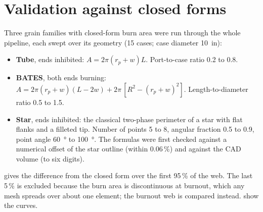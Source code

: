 \documentclass[10pt,a4paper]{article}
\begin{document}
\section{Validation against closed forms}
\label{sec:closed}

Three grain families with closed-form burn area were run through the whole pipeline, each swept
over its geometry (15 cases; case diameter \SI{10}{in}):

\begin{itemize}[leftmargin=1.4em,itemsep=0pt,topsep=1pt]
\item \textbf{Tube}, ends inhibited: $A = 2\pi(r_p + w)L$. Port-to-case ratio 0.2 to 0.8.
\item \textbf{BATES}, both ends burning:
  $A = 2\pi(r_p + w)(L - 2w) + 2\pi\,[R^2 - (r_p + w)^2]$. Length-to-diameter ratio 0.5 to 1.5.
\item \textbf{Star}, ends inhibited: the classical two-phase perimeter of a star with flat flanks
  and a filleted tip. Number of points 5 to 8, angular fraction 0.5 to 0.9, point angle
  \SI{60}{\degree} to \SI{100}{\degree}. The formulas were first checked against a numerical
  offset of the star outline (within 0.06\,\%) and against the CAD volume (to six digits).
\end{itemize}

 gives the difference from the closed form over the first 95\,\% of the web. The
last 5\,\% is excluded because the burn area is discontinuous at burnout, which any mesh spreads
over about one element; the burnout web is compared instead. 
show the curves.
\end{document}
